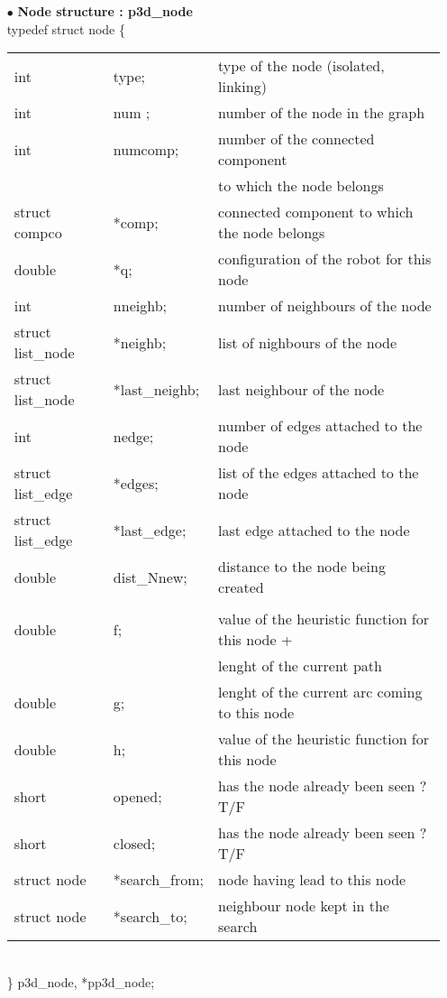 \begin{itemize}
\item[$\bullet$]{\bf Node structure : p3d\_node} \\

typedef struct node \{\\
\begin{tabular}{l l l}
  int         & type; & type of the node (isolated, linking)\\
  int         & num ;& number of the node in the graph\\
  int         & numcomp; & number of the connected component \\
              &          & to which the node belongs\\
  struct compco & *comp; & connected component to which the node belongs\\
  double      & *q; & configuration of the robot for this node\\
  int & nneighb; &    number of neighbours of the node\\
  struct list\_node & *neighb; & list of nighbours of the node\\
  struct list\_node & *last\_neighb; & last neighbour of the node\\
  int & nedge;  & number of edges attached to the node\\
  struct list\_edge & *edges;  & list of the edges attached to the node\\
  struct list\_edge & *last\_edge; & last edge attached to the node\\
  double & dist\_Nnew; & distance to the node being created\\
         &            &    \\
  double & f; &   value of the heuristic function for this node + \\
         &    &   lenght of the current path\\                               
  double & g; &   lenght of the current arc coming to this node\\
  double & h; &   value of the heuristic function for this node\\
  short & opened; & has the node already been seen ? T/F\\
  short & closed; & has the node already been seen ? T/F\\
  struct node & *search\_from; & node having lead to this node\\
  struct node & *search\_to;  & neighbour node kept in the search\\
 \end{tabular}\\
\} p3d\_node, *pp3d\_node;\\


\end{itemize}
